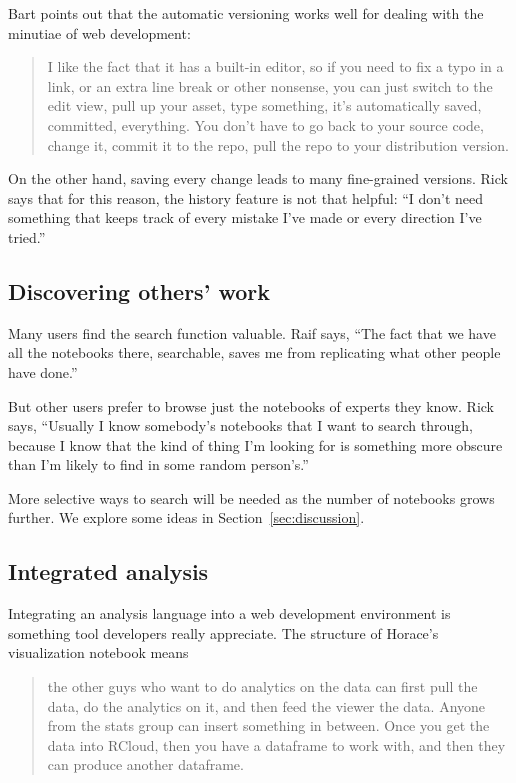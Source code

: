 
Bart points out that the automatic versioning works well for dealing with the
minutiae of web development:
\begin{quote}
I like the fact that it has a built-in editor, so
if you need to fix a typo in a link, or an extra line break or other
nonsense, you can just switch to the edit view, pull up your asset, type
something, it's automatically saved, committed, everything. You don't have to go
back to your source code, change it, commit it to the repo, pull the repo to
your distribution version. 
\end{quote}

On the other hand, saving every change leads to many fine-grained
versions. Rick says that for this reason, the history feature is not that
helpful: ``I don't need something that keeps track of every mistake I've made or
every direction I've tried.''


\subsection{Discovering others' work}
Many users find the search function valuable. Raif says, ``The fact that we have
all the notebooks there, searchable, saves me from replicating what other people
have done.''

But other users prefer to browse just the notebooks of experts they
know. Rick says, ``Usually I know somebody's notebooks that I want to search
through, because I know that the kind of thing I'm looking for is something
more obscure than I'm likely to find in some random person's.''

More selective ways to search will be needed as the number of notebooks
grows further. We explore some ideas in Section~\ref{sec:discussion}.

\subsection{Integrated analysis}
Integrating an analysis language into a web development environment is something
tool developers really appreciate.  The structure of Horace's visualization
notebook means
\begin{quote}
the other guys who want to do analytics on the data can first pull
the data, do the analytics on it, and then feed the viewer the data.
Anyone from the stats group can insert something in between.
Once you get the data into RCloud, then you have a dataframe
to work with, and then they can produce another dataframe.
\end{quote}

